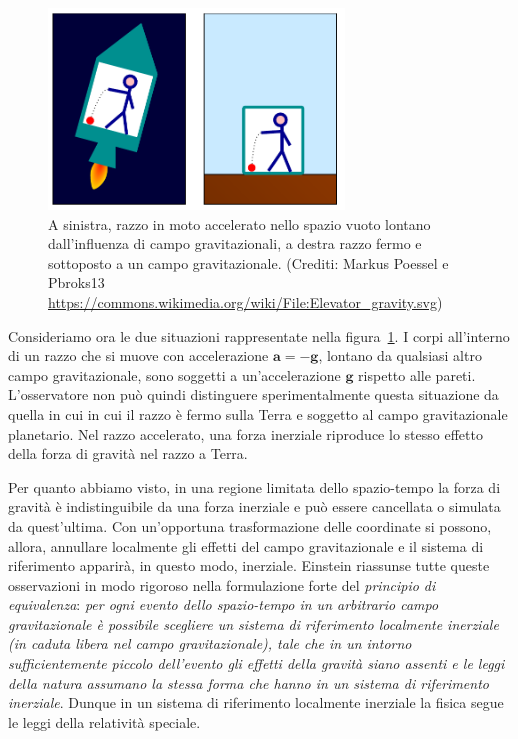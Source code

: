 \begin{figure}
  \centering
  \includegraphics[width=0.7\textwidth]{figure/Elevator_gravity}
  \caption[Illustrazione sul principio di equivalenza]{A sinistra, razzo in moto
    accelerato nello spazio vuoto lontano dall'influenza di campo
    gravitazionali, a destra razzo fermo e sottoposto a un campo gravitazionale.
    {\footnotesize (Crediti: Markus Poessel e Pbroks13
      \url{https://commons.wikimedia.org/wiki/File:Elevator_gravity.svg})}}
  \label{fig:razzo-princ-equiv}
\end{figure}
Consideriamo ora le due situazioni rappresentate nella
figura~\ref{fig:razzo-princ-equiv}.  I corpi all'interno di un razzo che si
muove con accelerazione $\bm{a}=-\bm{g}$, lontano da qualsiasi altro campo
gravitazionale, sono soggetti a un'accelerazione $\bm{g}$ rispetto alle pareti.
L'osservatore non può quindi distinguere sperimentalmente questa situazione da
quella in cui in cui il razzo è fermo sulla Terra e soggetto al campo
gravitazionale planetario.  Nel razzo accelerato, una forza inerziale riproduce
lo stesso effetto della forza di gravità nel razzo a Terra.

Per quanto abbiamo visto, in una regione limitata dello spazio-tempo la forza di
gravità è indistinguibile da una forza inerziale e può essere cancellata o
simulata da quest'ultima.  Con un'opportuna trasformazione delle coordinate si
possono, allora, annullare localmente gli effetti del campo gravitazionale e il
sistema di riferimento apparirà, in questo modo, inerziale.  Einstein riassunse
tutte queste osservazioni in modo rigoroso nella formulazione forte del
\emph{principio di equivalenza}:
\emph{per ogni evento dello spazio-tempo in un arbitrario campo gravitazionale è
  possibile scegliere un sistema di riferimento \emph{localmente inerziale} (in
  caduta libera nel campo gravitazionale), tale che in un intorno
  sufficientemente piccolo dell'evento gli effetti della gravità siano assenti e
  le leggi della natura assumano la stessa forma che hanno in un sistema di
  riferimento inerziale}.
Dunque in un sistema di riferimento localmente inerziale la fisica segue le
leggi della relatività speciale.

